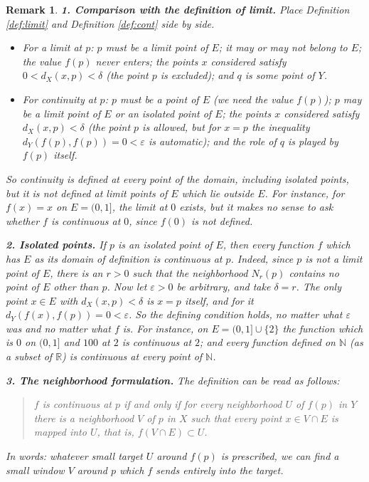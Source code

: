 \documentclass{article}
\theoremstyle{mythm}
\newtheorem{remark}[theorem]{Remark}
\begin{document}
\begin{remark}\label{rem:contcompare}
\textbf{1. Comparison with the definition of limit.} Place Definition \ref{def:limit} and Definition \ref{def:cont} side by side.
\begin{itemize}
    \item For a \textit{limit} at $p$: $p$ must be a limit point of $E$; it may or may not belong to $E$; the value $f(p)$ never enters; the points $x$ considered satisfy $0 < d_X(x,p) < \delta$ (the point $p$ is excluded); and $q$ is some point of $Y$.
    \item For \textit{continuity} at $p$: $p$ must be a point of $E$ (we need the value $f(p)$); $p$ may be a limit point of $E$ or an isolated point of $E$; the points $x$ considered satisfy $d_X(x,p) < \delta$ (the point $p$ is allowed, but for $x = p$ the inequality $d_Y(f(p), f(p)) = 0 < \varepsilon$ is automatic); and the role of $q$ is played by $f(p)$ itself.
\end{itemize}
So continuity is defined at \textit{every point of the domain}, including isolated points, but it is \textit{not} defined at limit points of $E$ which lie outside $E$. For instance, for $f(x) = x$ on $E = (0,1]$, the limit at $0$ exists, but it makes no sense to ask whether $f$ is continuous at $0$, since $f(0)$ is not defined.

\textbf{2. Isolated points.} If $p$ is an isolated point of $E$, then \textit{every} function $f$ which has $E$ as its domain of definition is continuous at $p$. Indeed, since $p$ is not a limit point of $E$, there is an $r > 0$ such that the neighborhood $N_r(p)$ contains no point of $E$ other than $p$. Now let $\varepsilon > 0$ be arbitrary, and take $\delta = r$. The only point $x \in E$ with $d_X(x,p) < \delta$ is $x = p$ itself, and for it $d_Y(f(x), f(p)) = 0 < \varepsilon$. So the defining condition holds, no matter what $\varepsilon$ was and no matter what $f$ is. For instance, on $E = (0,1] \cup \{2\}$ the function which is $0$ on $(0,1]$ and $100$ at $2$ is continuous at $2$; and every function defined on $\mathbb{N}$ (as a subset of $\mathbb{R}$) is continuous at every point of $\mathbb{N}$.

\textbf{3. The neighborhood formulation.} The definition can be read as follows:
\begin{quote}
\textit{$f$ is continuous at $p$ if and only if for every neighborhood $U$ of $f(p)$ in $Y$ there is a neighborhood $V$ of $p$ in $X$ such that every point $x \in V \cap E$ is mapped into $U$, that is, $f(V \cap E) \subset U$.}
\end{quote}
In words: whatever small target $U$ around $f(p)$ is prescribed, we can find a small window $V$ around $p$ which $f$ sends entirely into the target.


\end{remark}
\end{document}
